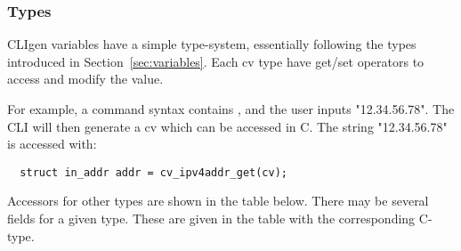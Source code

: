 \documentclass[a4paper, 10pt] {article}
\begin{document}
\subsubsection{Types}

CLIgen variables have a simple type-system, essentially following the
types introduced in Section~\ref{sec:variables}. Each cv type
have get/set operators to access and modify the value.

For example, a command syntax contains {\tt <addr:ipv4addr>}, and
the user inputs "12.34.56.78". The CLI will then generate a cv which
can be accessed in C. The string
"12.34.56.78" is accessed with:
\begin{verbatim}
  struct in_addr addr = cv_ipv4addr_get(cv);
\end{verbatim}

Accessors for other types are shown in the table
below. There may be several fields for a given type. These are given
in the table with the corresponding C-type.
\end{document}
